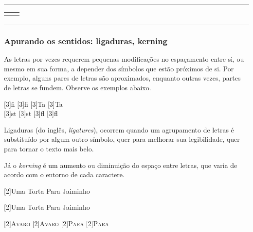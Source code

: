 \medskip
\begin{center}\footnotesize\hrule\smallskip
\begin{tabular}{c|c}
\begin{minipage}{.465\textwidth}

\end{minipage} &
\begin{minipage}{.465\textwidth}

\end{minipage}
\end{tabular}
\smallskip\hrule
\end{center}
\medskip
 
\subsubsection[Ligaduras e Kerning]{Apurando os sentidos: ligaduras, kerning}%

As letras por vezes requerem pequenas modificações no espaçamento
entre si, ou mesmo em sua forma, a depender dos símbolos que estão
próximos de si. Por exemplo, alguns pares de letras são aproximados,
enquanto outras vezes, partes de letras se fundem. Observe os exemplos
abaixo.

\medskip
\noindent\begin{center}%
\scalebox{3}[3]{f{i}}\hfil%
\scalebox{3}[3]{fi}\hfil%
\scalebox{3}[3]{T{a}}\hfil%
\scalebox{3}[3]{Ta}
\\[.9cm] 
\scalebox{3}[3]{s{t}}\hfil%
\scalebox{3}[3]{st}\hfil%
\scalebox{3}[3]{f{l}}\hfil%
\scalebox{3}[3]{fl}
\end{center}
\medskip

Ligaduras (do inglês, \emph{ligatures}), ocorrem quando um agrupamento
de letras é substituído por algum outro símbolo, quer para melhorar sua legibilidade, quer para tornar o texto mais belo.

Já o \emph{kerning} é um aumento ou diminuição do espaço entre letras,
que varia de acordo com o entorno de cada caractere.

\medskip
\noindent\begin{center}%
\scalebox{2}[2]{Uma {T}orta {P}ara {J}aiminho}

\scalebox{2}[2]{Uma Torta Para Jaiminho}

\medskip

\scalebox{2}[2]{\textsc{{A}v{a}r{o}}}\hfil%
\scalebox{2}[2]{\textsc{Avaro}}%
\hfil\scalebox{2}[2]{\textsc{{P}a{r}a}}
\hfil\scalebox{2}[2]{\textsc{Para}}\hfil
\end{center}

